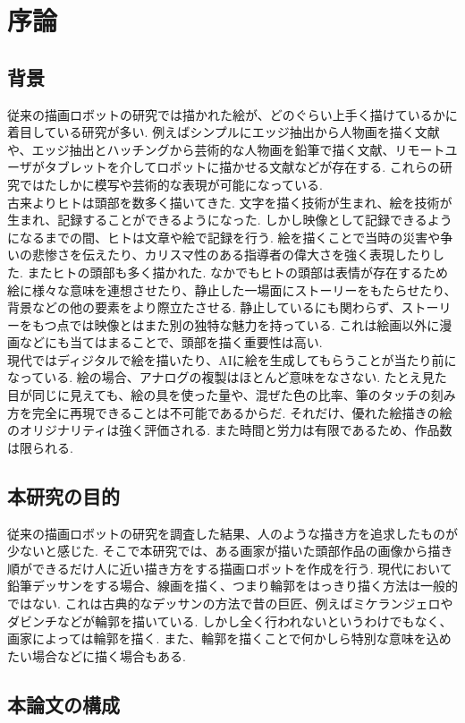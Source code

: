 \chapter{序論}
  \label{chap:intro}
  \section{背景}
    \label{sec:background}
	従来の描画ロボットの研究では描かれた絵が、どのぐらい上手く描けているかに着目している研究が多い.
    例えばシンプルにエッジ抽出から人物画を描く文献\cite{1}や、エッジ抽出とハッチングから芸術的な人物画を鉛筆で描く文献\cite{2}、リモートユーザがタブレットを介してロボットに描かせる文献\cite{3}などが存在する.
	これらの研究ではたしかに模写や芸術的な表現が可能になっている.
	\\
	\hspace{10pt}古来よりヒトは頭部を数多く描いてきた.
	文字を描く技術が生まれ、絵を技術が生まれ、記録することができるようになった.
	しかし映像として記録できるようになるまでの間、ヒトは文章や絵で記録を行う.
	絵を描くことで当時の災害や争いの悲惨さを伝えたり、カリスマ性のある指導者の偉大さを強く表現したりした.
	またヒトの頭部も多く描かれた.
	なかでもヒトの頭部は表情が存在するため絵に様々な意味を連想させたり、静止した一場面にストーリーをもたらせたり、背景などの他の要素をより際立たさせる.
	静止しているにも関わらず、ストーリーをもつ点では映像とはまた別の独特な魅力を持っている.
	これは絵画以外に漫画などにも当てはまることで、頭部を描く重要性は高い.\\
	\hspace{10pt}現代ではディジタルで絵を描いたり、AIに絵を生成してもらうことが当たり前になっている.
	絵の場合、アナログの複製はほとんど意味をなさない. 
	たとえ見た目が同じに見えても、絵の具を使った量や、混ぜた色の比率、筆のタッチの刻み方を完全に再現できることは不可能であるからだ.
	それだけ、優れた絵描きの絵のオリジナリティは強く評価される.
	また時間と労力は有限であるため、作品数は限られる.



  \section{本研究の目的}
    \label{sec:target}
	従来の描画ロボットの研究を調査した結果、人のような描き方を追求したものが少ないと感じた.
	そこで本研究では、ある画家が描いた頭部作品の画像から描き順ができるだけ人に近い描き方をする描画ロボットを作成を行う.
	\hspace{10pt}
   現代において鉛筆デッサンをする場合、線画を描く、つまり輪郭をはっきり描く方法は一般的ではない.
	これは古典的なデッサンの方法で昔の巨匠、例えばミケランジェロやダビンチなどが輪郭を描いている.
	しかし全く行われないというわけでもなく、画家によっては輪郭を描く.
	また、輪郭を描くことで何かしら特別な意味を込めたい場合などに描く場合もある. 
	
	\section{本論文の構成}
    \label{sec:construction_of_this_paper}
    
